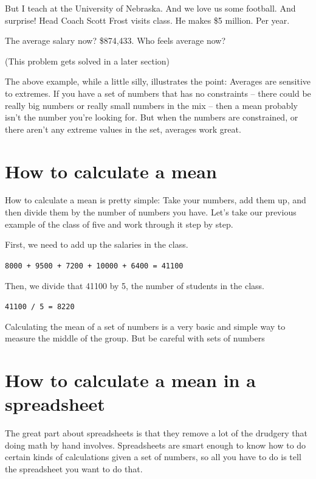 \documentclass[]{book}
\begin{document}
But I teach at the University of Nebraska. And we love us some football. And surprise! Head Coach Scott Frost visits class. He makes \$5 million. Per year.

The average salary now? \$874,433. Who feels average now?

(This problem gets solved in a later section)

The above example, while a little silly, illustrates the point: Averages are sensitive to extremes. If you have a set of numbers that has no constraints -- there could be really big numbers or really small numbers in the mix -- then a mean probably isn't the number you're looking for. But when the numbers are constrained, or there aren't any extreme values in the set, averages work great.

\hypertarget{how-to-calculate-a-mean}{%
\section{How to calculate a mean}\label{how-to-calculate-a-mean}}

How to calculate a mean is pretty simple: Take your numbers, add them up, and then divide them by the number of numbers you have. Let's take our previous example of the class of five and work through it step by step.

First, we need to add up the salaries in the class.

\texttt{8000\ +\ 9500\ +\ 7200\ +\ 10000\ +\ 6400\ =\ 41100}

Then, we divide that 41100 by 5, the number of students in the class.

\texttt{41100\ /\ 5\ =\ 8220}

Calculating the mean of a set of numbers is a very basic and simple way to measure the middle of the group. But be careful with sets of numbers

\hypertarget{how-to-calculate-a-mean-in-a-spreadsheet}{%
\section{How to calculate a mean in a spreadsheet}\label{how-to-calculate-a-mean-in-a-spreadsheet}}

The great part about spreadsheets is that they remove a lot of the drudgery that doing math by hand involves. Spreadsheets are smart enough to know how to do certain kinds of calculations given a set of numbers, so all you have to do is tell the spreadsheet you want to do that.
\end{document}
